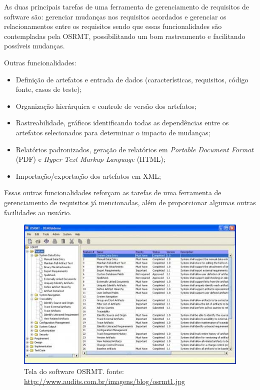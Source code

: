 As duas principais tarefas de uma ferramenta de gerenciamento de requisitos de software são: gerenciar mudanças nos requisitos acordados e gerenciar os relacionamentos entre os requisitos \cite{dourado2008} sendo que essas funcionalidades são contempladas pela OSRMT, possibilitando um bom rastreamento e facilitando possíveis mudanças.

Outras funcionalidades:
\begin{itemize}
    \item Definição de artefatos e entrada de dados (características, requisitos, código fonte, casos de teste);
    \item Organização hierárquica e controle de versão dos artefatos;
    \item Rastreabilidade, gráficos identificando todas as dependências entre os artefatos selecionados para determinar o impacto de mudanças;
    \item Relatórios padronizados, geração de relatórios em \textit{Portable Document Format} (PDF) e \textit{Hyper Text Markup Language} (HTML);
    \item Importação/exportação dos artefatos em XML;
\end{itemize}
Essas outras funcionalidades reforçam as tarefas de uma ferramenta de gerenciamento de requisitos já mencionadas, além de proporcionar algumas outras facilidades ao usuário.
\begin{figure}[H]
    \centering
    \label{osrmt}
    \caption[Tela do software OSRMT]{Tela do software OSRMT. fonte: \url{http://www.audits.com.br/imagens/blog/osrmt1.jpg}}
    \includegraphics[keepaspectratio=true,scale=1.0]{figuras/ferramentasosrmt.eps}
\end{figure}

